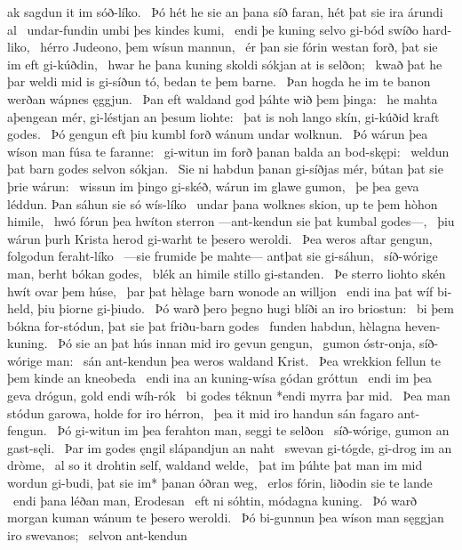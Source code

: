 ak sagdun it im sóð-líko. \hld\ Þó hét he sie an þana síð faran,
hét þat sie ira árundi al \hld\ undar-fundin
umbi þes kindes kumi, \hld\ endi þe kuning selvo gi-bód
swíðo hard-liko, \hld\ hérro Judeono,
þem wísun mannun, \hld\ ér þan sie fórin westan forð,
þat sie im eft gi-kúðdin, \hld\ hwar he þana kuning skoldi
sókjan at is selðon; \hld\ kwað þat he þar weldi mid is gi-síðun tó,
bedan te þem barne. \hld\ Þan hogda he im te banon werðan
wápnes ęggjun. \hld\ Þan eft waldand god
þáhte wið þem þinga: \hld\ he mahta aþengean mér,
gi-léstjan an þesum liohte: \hld\ þat is noh lango skín,
gi-kúðid kraft godes. \hld\ Þó gengun eft þiu kumbl forð
wánum undar wolknun. \hld\ Þó wárun þea wíson man
fúsa te faranne: \hld\ gi-witun im forð þanan
balda an bod-skępi: \hld\ weldun þat barn godes
selvon sókjan. \hld\ Sie ni habdun þanan gi-síðjas mér,
bútan þat sie þrie wárun: \hld\ wissun im þingo gi-skéð,
wárun im glawe gumon, \hld\ þe þea geva léddun.
Þan sáhun sie só wís-líko \hld\ undar þana wolknes skion,
up te þem hòhon himile, \hld\ hwó fórun þea hwíton sterron
—ant-kendun sie þat kumbal godes—, \hld\ þiu wárun þurh Krista herod
gi-warht te þesero weroldi. \hld\ Þea weros aftar gengun,
folgodun feraht-líko \hld\ —sie frumide þe mahte—
antþat sie gi-sáhun, \hld\ síð-wórige man,
berht bókan godes, \hld\ blék an himile
stillo gi-standen. \hld\ Þe sterro liohto skén
hwít ovar þem húse, \hld\ þar þat hèlage barn
wonode an willjon \hld\ endi ina þat wíf bi-held,
þiu þiorne gi-þiudo. \hld\ Þó warð þero þegno hugi
blíði an iro briostun: \hld\ bi þem bókna for-stódun,
þat sie þat friðu-barn godes \hld\ funden habdun,
hèlagna heven-kuning. \hld\ Þó sie an þat hús innan
mid iro gevun gengun, \hld\ gumon óstr-onja,
síð-wórige man: \hld\ sán ant-kendun
þea weros waldand Krist. \hld\ Þea wrekkion fellun
te þem kinde an kneobeda \hld\ endi ina an kuning-wísa
gódan gróttun \hld\ endi im þea geva drógun,
gold endi wíh-rók \hld\ bi godes téknun
*endi myrra þar mid. \hld\ Þea man stódun garowa,
holde for iro hérron, \hld\ þea it mid iro handun sán
fagaro ant-fengun. \hld\ Þó gi-witun im þea ferahton man,
seggi te selðon \hld\ síð-wórige,
gumon an gast-sęli. \hld\ Þar im godes ęngil
slápandjun an naht \hld\ swevan gi-tógde,
gi-drog im an dròme, \hld\ al so it drohtin self,
waldand welde, \hld\ þat im þúhte þat man im mid wordun gi-budi,
þat sie im* þanan óðran weg, \hld\ erlos fórin,
liðodin sie te lande \hld\ endi þana léðan man,
Erodesan \hld\ eft ni sóhtin,
módagna kuning. \hld\ Þó warð morgan kuman
wánum te þesero weroldi. \hld\ Þó bi-gunnun þea wíson man
sęggjan iro swevanos; \hld\ selvon ant-kendun
